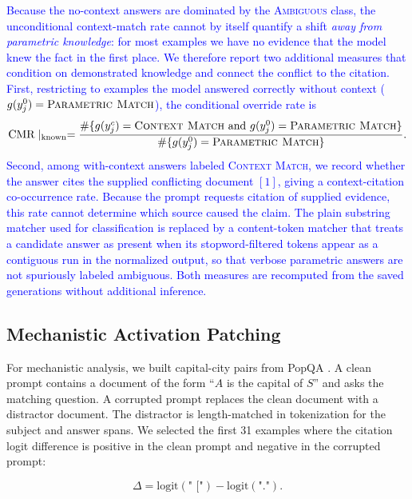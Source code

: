 \documentclass[a4paper,fleqn]{cas-sc}
\begin{document}
\textcolor{blue}{Because the no-context answers are dominated by the \textsc{Ambiguous} class, the unconditional context-match rate cannot by itself quantify a shift \emph{away from parametric knowledge}: for most examples we have no evidence that the model knew the fact in the first place. We therefore report two additional measures that condition on demonstrated knowledge and connect the conflict to the citation. First, restricting to examples the model answered correctly without context ($g(y_j^{0})=\textsc{Parametric\ Match}$), the conditional override rate is}
\begin{equation}
    \mathrm{CMR}\mid_{\mathrm{known}}=\frac{\#\{g(y_j^{c})=\textsc{Context\ Match}\ \text{and}\ g(y_j^{0})=\textsc{Parametric\ Match}\}}{\#\{g(y_j^{0})=\textsc{Parametric\ Match}\}}.
\end{equation}
\textcolor{blue}{Second, among with-context answers labeled \textsc{Context Match}, we record whether the answer cites the supplied conflicting document $[1]$, giving a context-citation co-occurrence rate. Because the prompt requests citation of supplied evidence, this rate cannot determine which source caused the claim. The plain substring matcher used for classification is replaced by a content-token matcher that treats a candidate answer as present when its stopword-filtered tokens appear as a contiguous run in the normalized output, so that verbose parametric answers are not spuriously labeled ambiguous. Both measures are recomputed from the saved generations without additional inference.}

\subsection{Mechanistic Activation Patching}

For mechanistic analysis, we built capital-city pairs from PopQA \cite{mallen2023popqa}. A clean prompt contains a document of the form ``$A$ is the capital of $S$'' and asks the matching question. A corrupted prompt replaces the clean document with a distractor document. The distractor is length-matched in tokenization for the subject and answer spans. We selected the first 31 examples where the citation logit difference is positive in the clean prompt and negative in the corrupted prompt:

\begin{equation}
    \Delta = \mathrm{logit}(\texttt{" ["}) - \mathrm{logit}(\texttt{"."}).
\end{equation}
\end{document}
